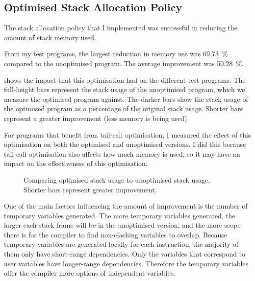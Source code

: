 \documentclass[00-main.tex]{subfiles}
\begin{document}
\subsection{Optimised Stack Allocation Policy}

The stack allocation policy that I implemented was successful in reducing the amount of stack memory used.

From my test programs, the largest reduction in memory use was \SI{69.73}{\percent} compared to the unoptimised program.
The average improvement was \SI{50.28}{\percent}.

 shows the impact that this optimisation had on the different test programs.
The full-height bars represent the stack usage of the unoptimised program, which we measure the optimised program against.
The darker bars show the stack usage of the optimised program as a percentage of the original stack usage.
Shorter bars represent a greater improvement (less memory is being used).

For programs that benefit from tail-call optimisation, I measured the effect of this optimisation on both the optimised and unoptimised versions.
I did this because tail-call optimisation also affects how much memory is used, so it may have an impact on the effectiveness of this optimisation.

\begin{figure}[ht]
  \centering
  \caption{Comparing optimised stack usage to unoptimised stack usage. Shorter bars represent greater improvement.}
  \label{fig:comparing stack usage optimisation across programs} %
\end{figure}

One of the main factors influencing the amount of improvement is the number of temporary variables generated.
The more temporary variables generated, the larger each stack frame will be in the unoptimised version, and the more scope there is for the compiler to find non-clashing variables to overlap.
Because temporary variables are generated locally for each instruction, the majority of them only have short-range dependencies.
Only the variables that correspond to user variables have longer-range dependencies.
Therefore the temporary variables offer the compiler more options of independent variables.
\end{document}
